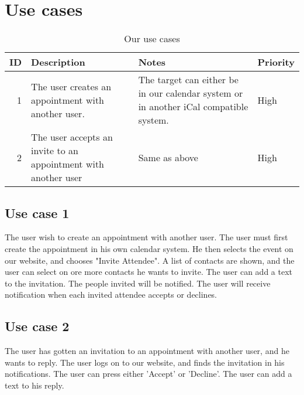 \section{Use cases}
\begin{table*}[ht]\centering
  \begin{tabularx}{\textwidth}{@{}rXXl@{}}\toprule
    \textbf{ID} & \textbf{Description} & \textbf{Notes} & \textbf{Priority} \\\hline
    1 & The user creates an appointment with another user.             & The
    target can either be in our calendar system or in another iCal compatible
    system. & High \\\hline
    2 & The user accepts an invite to an appointment with another user & Same
    as above
    & High \\
    \bottomrule
  \end{tabularx}
  \caption{Our use cases}
  \label{usecases}\centering%
\end{table*}
\subsection{Use case 1}
The user wish to create an appointment with another user. The user must first create the appointment in his own calendar system. He then selects the event on our website, and chooses "Invite Attendee". A list of contacts are shown, and the user can select on ore more contacts he wants to invite. The user can add a text to the invitation. The people invited will be notified. The user will receive notification when each invited attendee accepts or declines.
\subsection{Use case 2}
The user has gotten an invitation to an appointment with another user, and he wants to reply.
The user logs on to our website, and finds the invitation in his notifications. The user can press either 'Accept' or 'Decline'. The user can add a text to his reply.